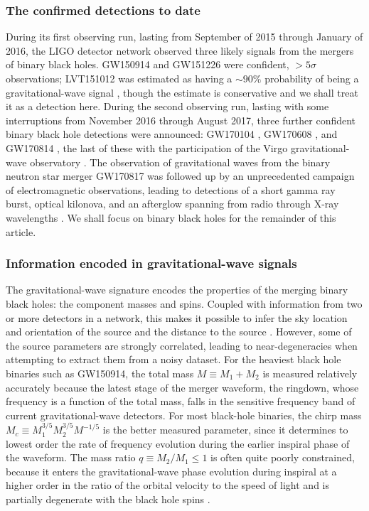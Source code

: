 \documentclass[iop,onecolumn]{revtex4-1}
\begin{document}
\subsubsection{The confirmed detections to date}
During its first observing run, lasting from September of 2015 through January of 2016, the LIGO detector network observed three likely signals from the mergers of binary black holes.  GW150914 \citep{GW150914} and GW151226 \citep{GW151226} were confident, $> 5\sigma$ observations; LVT151012 was estimated as having a $\sim 90\%$ probability of being a gravitational-wave signal \citep{GW150914:rates,BBH:O1}, though the estimate is conservative and we shall treat it as a detection here.  During the second observing run, lasting with some interruptions from November 2016 through August 2017, three further confident binary black hole detections were announced: GW170104 \citep{GW170104},  GW170608 \citep{GW170608}, and GW170814 \citep{GW170814}, the last of these with the participation of the Virgo gravitational-wave observatory \citep{AdvVirgo}.   The observation of gravitational waves from the binary neutron star merger GW170817 \citep{GW170817} was followed up by an unprecedented campaign of electromagnetic observations, leading to detections of a short gamma ray burst, optical kilonova, and an afterglow spanning from radio through X-ray wavelengths \citep{GW170817:GRB,GW170817:MMA}.  We shall focus on binary black holes for the remainder of this article.

\subsubsection{Information encoded in gravitational-wave signals}
The gravitational-wave signature encodes the properties of the merging binary black holes: the component masses and spins. Coupled with information from two or more detectors in a network, this makes it possible to infer the sky location and orientation of the source and the distance to the source \citep{Veitch:2014,GW150914:PE}.  However, some of the source parameters are strongly correlated, leading to near-degeneracies when attempting to extract them from a noisy dataset.   For the heaviest black hole binaries such as GW150914, the total mass $M \equiv M_1 + M_2$ is measured relatively accurately because the latest stage of the merger waveform, the ringdown, whose frequency is a function of the total mass, falls in the sensitive frequency band of current gravitational-wave detectors.  For most black-hole binaries, the chirp mass $M_c \equiv M_1^{3/5} M_2^{3/5} M^{-1/5}$ is the better measured parameter, since it determines to lowest order the rate of frequency evolution during the earlier inspiral phase of the waveform.  The mass ratio $q\equiv M_2/M_1 \leq 1$ is often quite poorly constrained, because it enters the gravitational-wave phase evolution during inspiral at a higher order in the ratio of the orbital velocity to the speed of light and is partially degenerate with the black hole spins \citep[e.g.,][]{PoissonWill:1995}.  
\end{document}
